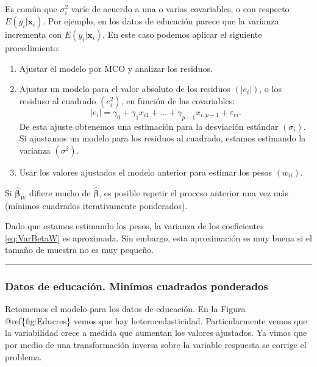 \documentclass[
]{article}
\providecommand{\tightlist}{%
  \setlength{\itemsep}{0pt}\setlength{\parskip}{0pt}}
\begin{document}
Es común que \(\sigma^{2}_{i}\) varíe de acuerdo a una o varias covariables, o con respecto \(E(y_{i}|\boldsymbol x_{i})\). Por ejemplo, en los datos de educación parece que la varianza incrementa con \(E(y_{i}| \boldsymbol x_{i})\). En este caso podemos aplicar el siguiente procedimiento:

\begin{enumerate}
\def\labelenumi{\arabic{enumi}.}
\tightlist
\item
  Ajustar el modelo por MCO y analizar los residuos.
\item
  Ajustar un modelo para el valor absoluto de los residuos \((|e_{i}|)\), o los residuso al cuadrado \((e^{2}_{i})\), en función de las covariables:
  \[
  |e_{i}| = \gamma_{0} + \gamma_{1}x_{i1}+ \ldots + \gamma_{p-1}x_{i,p-1} + \varepsilon_{ei}.
  \]
  De esta ajuste obtenemos una estimación para la desviación estándar \((\sigma_{i})\). Si ajustamos un modelo para los residuos al cuadrado, estamos estimando la varianza \((\sigma^{2})\).
\item
  Usar los valores ajustados el modelo anterior para estimar los pesos \((w_{ii})\).
\end{enumerate}

Si \(\widehat{\boldsymbol \beta}_{W}\) difiere mucho de \(\widehat{\boldsymbol \beta}\), es posible repetir el proceso anterior una vez más (mínimos cuadrados iterativamente ponderados).

Dado que estamos estimando los pesos, la varianza de los coeficientes \eqref{eq:VarBetaW} es aproximada. Sin embargo, esta aproximación es muy buena si el tamaño de muestra no es muy pequeño.

\rule{\textwidth}{0.4pt}

\hypertarget{datos-de-educaciuxf3n.-minuxedmos-cuadrados-ponderados}{%
\subsubsection*{Datos de educación. Minímos cuadrados ponderados}\label{datos-de-educaciuxf3n.-minuxedmos-cuadrados-ponderados}}

Retomemos el modelo para los datos de educación. En la Figura @ref\{fig:Educres\} vemos que hay heterocedasticidad. Particularmente vemos que la variabilidad crece a medida que aumentan los valores ajustados. Ya vimos que por medio de una transformación inversa sobre la variable respuesta se corrige el problema.
\end{document}
